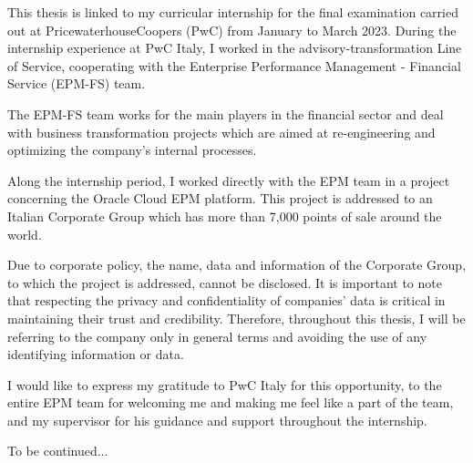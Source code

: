 \documentclass[12pt,a4paper,openright,twoside]{book}
\begin{document}
	
\frontmatter



\begin{acknowledgements}

This thesis is linked to my curricular internship for the final examination carried out at PricewaterhouseCoopers (PwC) from January to March 2023.
%
During the internship experience at PwC Italy, I worked in the advisory-transformation Line of Service, cooperating with the Enterprise Performance Management - Financial Service (EPM-FS) team.

The EPM-FS team works for the main players in the financial sector and deal with business transformation projects which are aimed at re-engineering and optimizing the company's internal processes.

Along the internship period, I worked directly with the EPM team in a project concerning the Oracle Cloud EPM platform.
%
This project is addressed to an Italian Corporate Group which has more than 7,000 points of sale around the world. 

Due to corporate policy, the name, data and information of the Corporate Group, to which the project is addressed, cannot be disclosed. 
%
It is important to note that respecting the privacy and confidentiality of companies' data is critical in maintaining their trust and credibility.
%
Therefore, throughout this thesis, I will be referring to the company only in general terms and avoiding the use of any identifying information or data.

I would like to express my gratitude to PwC Italy for this opportunity, to the entire EPM team for welcoming me and making me feel like a part of the team, and my supervisor for his guidance and support throughout the internship.

To be continued...

\end{acknowledgements}
\end{document}
